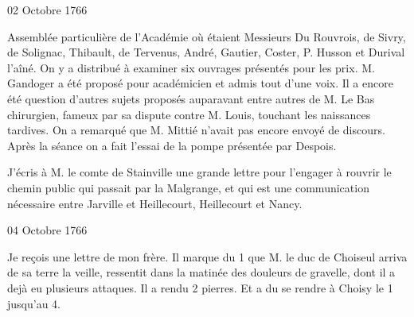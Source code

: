                      \begin{diary}{02 Octobre 1766}{}

                         Assemblée particulière de l’Académie où
                           étaient Messieurs
                           Du Rouvrois, de Sivry, de
                              Solignac, Thibault, de
                           Tervenus, André,
                           Gautier, Coster, P. Husson et
                              Durival l’aîné.
                           On y a distribué à examiner six ouvrages
                           présentés pour les prix. M.
                              Gandoger
                           a été proposé pour académicien et admis
                           tout d’une voix. Il a encore été question
                           d’autres sujets proposés auparavant entre autres
                           de M. Le Bas chirurgien, fameux
                           par sa
                           dispute contre M. Louis, touchant
                           les
                           naissances tardives. On a remarqué
                           que M. Mittié n’avait pas
                           encore envoyé
                           de discours. Après la séance on a fait
                           l’essai de la pompe présentée par Despois. \bigskip


                         J’écris à M. le comte
                              de Stainville une
                           grande lettre pour l’engager à rouvrir
                           le chemin public qui passait par la
                              Malgrange, et qui est une communication
                           nécessaire entre Jarville
                           et Heillecourt,
                           Heillecourt et Nancy. \bigskip


                     \end{diary}


                     \begin{diary}{04 Octobre 1766}{}

                         Je reçois une lettre de mon
                              frère. Il
                           marque du 1
                           que M. le duc de
                              Choiseul arriva de sa terre la veille,
                           ressentit dans la matinée des douleurs
                           de gravelle, dont il a
                           dejà eu plusieurs
                           attaques. Il a rendu 2 pierres. Et a
                           du se rendre à Choisy
                           le 1
                              jusqu’au 4. \bigskip


                     \end{diary}

